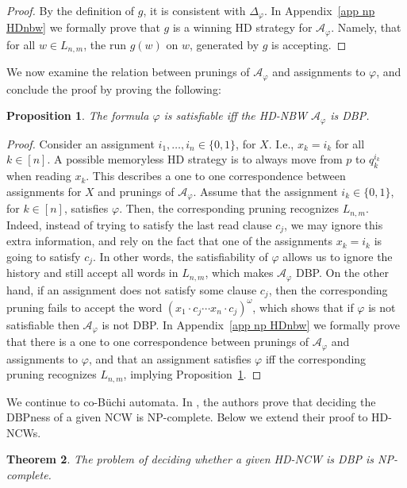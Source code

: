 \documentclass[10pt,a4paper]{amsart}
\newtheorem{thm}{Theorem}[section]
\newtheorem{prop}[thm]{Proposition}
\theoremstyle{definition}
\numberwithin{equation}{section}
\newcommand{\buchi}{B\"uchi\xspace}
\newcommand{\A}{{\mathcal A}}
\begin{document}
\begin{proof}
	By the definition of $g$, it is consistent with $\Delta_\varphi$. In Appendix~\ref{app np HDnbw} we formally prove that $g$ is a winning HD strategy for $\A_\varphi$. Namely, that for all $w\in L_{n,m}$, the run $g(w)$ on $w$, generated by $g$ is accepting.
\end{proof}

We now examine the relation between prunings of $\A_\varphi$ and assignments to $\varphi$, and conclude the proof by proving the following:

\begin{prop}\label{dbp iff sat}
		The formula $\varphi$ is satisfiable iff the HD-NBW $\A_\varphi$ is DBP.
\end{prop}

\begin{proof}
Consider an assignment $i_1,\ldots,i_n\in \{0,1\}$, for $X$. I.e., $x_k=i_k$ for all $k\in[n]$. A possible memoryless HD strategy is to always move from $p$ to $q^{i_k}_k$ when reading $x_k$. This describes a one to one correspondence between assignments for $X$ and prunings of $\A_\varphi$. Assume that the assignment $i_k\in \{0,1\}$, for $k\in [n]$, satisfies $\varphi$. Then, the corresponding pruning recognizes $L_{n,m}$. Indeed, instead of trying to satisfy the last read clause $c_j$, we may ignore this extra information, and rely on the fact that one of the assignments $x_k=i_k$ is going to satisfy $c_j$. In other words, the satisfiability of $\varphi$ allows us to ignore the history and still accept all words in $L_{n,m}$, which makes $\A_\varphi$ DBP. On the other hand, if an assignment does not satisfy some clause $c_j$, then the corresponding pruning fails to accept the word $(x_1\cdot c_j\cdots x_n\cdot c_j)^\omega$, which shows that if $\varphi$ is not satisfiable then $\A_\varphi$ is not DBP. In Appendix~\ref{app np HDnbw} we formally prove that there is a one to one correspondence between prunings of $\A_\varphi$ and assignments to $\varphi$, and that an assignment satisfies $\varphi$ iff the corresponding pruning recognizes $L_{n,m}$, implying Proposition~\ref{dbp iff sat}.
\end{proof}



We continue to co-\buchi automata. In \cite{KM18}, the authors prove that deciding the DBPness of a given NCW is NP-complete. Below we extend their proof to HD-NCWs.


\begin{thm}\label{NPC coBuchi DBP}
	The problem of deciding whether a given HD-NCW is DBP is NP-complete.
\end{thm}
\end{document}
